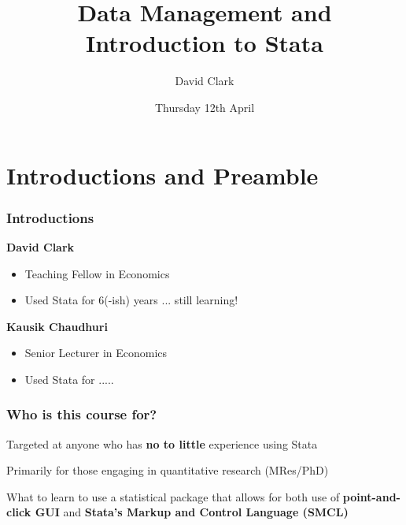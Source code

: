 \documentclass[10pt, compress]{beamer}
\title{Data Management and Introduction to Stata}
\subtitle{}
\date{Thursday 12th April}
\author{David Clark}
\institute{University of Leeds}
\begin{document}
\maketitle

\section{Introductions and Preamble}

\begin{frame}[fragile]
  \frametitle{Introductions}

\textbf{David Clark}
\begin{itemize}
    \item Teaching Fellow in Economics
    
    \item Used Stata for 6(-ish) years ... still learning!
\end{itemize}
    
   \textbf{Kausik Chaudhuri}
\begin{itemize}
    \item  Senior Lecturer in Economics
    
   \item  Used Stata for ..... 
    
\end{itemize}

\end{frame}

\begin{frame}[fragile]
  \frametitle{Who is this course for?}
    Targeted at anyone who has \textbf{no to little} experience using Stata
    
    Primarily for those engaging in \alert{quantitative} research (MRes/PhD)
    
    What to learn to use a statistical package that allows for both use of \textbf{point-and-click GUI} and \textbf{Stata's Markup and Control Language (SMCL)}
      
\end{frame}
\end{document}
